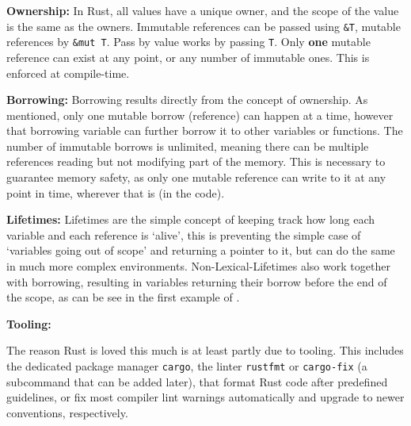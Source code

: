 
\textbf{Ownership:}\label{sec:ownership}
In Rust, all values have a unique owner, and the scope of the value is the same
as the owners. Immutable references can be passed using \verb|&T|, mutable
references by \verb|&mut T|. Pass by value works by passing \verb|T|. Only
\textbf{one} mutable reference can exist at any point, or any number of
immutable ones. This is enforced at compile-time.

\textbf{Borrowing:}\label{sec:borrowing}
Borrowing results directly from the concept of ownership. As mentioned, only one mutable
borrow (reference) can happen at a time, however that borrowing variable can
further borrow it to other variables or functions. The number of immutable
borrows is unlimited, meaning there can be multiple references reading but not
modifying part of the memory. This is necessary to guarantee memory safety, as
only one mutable reference can write to it at any point in time, wherever that
is (in the code).

\textbf{Lifetimes:}\label{sec:lifetimes}
Lifetimes are the simple concept of keeping track how long each variable and
each reference is `alive', this is preventing the simple case of `variables
going out of scope' and returning a pointer to it, but can do the same in much
more complex environments. Non-Lexical-Lifetimes also work together with
borrowing, resulting in variables returning their borrow before the end of the
scope, as can be see in the first example of .

\textbf{Tooling:}\label{sec:tools}

The reason Rust is loved \cite{rustloved} this much is at least partly due to
tooling. This includes the dedicated package manager \verb|cargo|, the linter
\verb|rustfmt| or \verb|cargo-fix| (a subcommand that can be added later), that
format Rust code after predefined guidelines, or fix most compiler lint warnings
automatically and upgrade to newer conventions, respectively.

